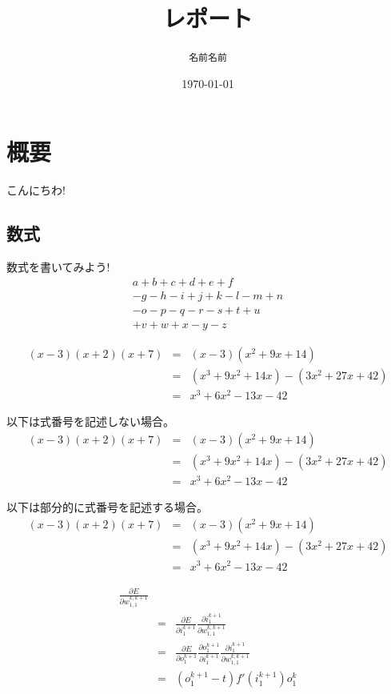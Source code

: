 \documentclass[a4j,uplatex,titlepage]{jsarticle}
\begin{document}
\title{レポート}
\author{\texttt{名前名前}}
\date{\today}
\maketitle
\clearpage

\tableofcontents
\clearpage


\section{概要}
こんにちわ!
\subsection{数式}
数式\cite{eq1}を書いてみよう!
\begin{multline}
    a+b+c+d+e+f \\
    -g-h-i+j+k-l-m+n \\
    -o-p-q-r-s+t+u \\
    +v+w+x-y-z
\end{multline}

\begin{eqnarray}
    (x - 3)(x + 2)(x + 7) &=& (x - 3)(x^2 + 9x + 14) \\
    &=& (x^3 + 9x^2 + 14x) - (3x^2 + 27x + 42) \\
    &=& x^3 + 6x^2 - 13x - 42
\end{eqnarray}

以下は式番号を記述しない場合。
\begin{eqnarray*}
    (x - 3)(x + 2)(x + 7) &=& (x - 3)(x^2 + 9x + 14) \\
    &=& (x^3 + 9x^2 + 14x) - (3x^2 + 27x + 42) \\
    &=& x^3 + 6x^2 - 13x - 42 
\end{eqnarray*}

以下は部分的に式番号を記述する場合。
\begin{eqnarray}
    (x - 3)(x + 2)(x + 7) &=& (x - 3)(x^2 + 9x + 14) \nonumber\\
    &=& (x^3 + 9x^2 + 14x) - (3x^2 + 27x + 42) \nonumber\\
    &=& x^3 + 6x^2 - 13x - 42 
\end{eqnarray}

\begin{eqnarray}
    \frac{\partial E}{\partial w^{k,k+1}_{1,1}}\nonumber\\
    &=& \frac{\partial E}{\partial i^{k+1}_1} \frac{\partial i^{k+1}_1}{\partial w^{k,k+1}_{1,1}}\nonumber\\
    &=& \frac{\partial E}{\partial o^{k+1}_1} \frac{\partial o^{k+1}_1}{\partial i^{k+1}_1} \frac{\partial i^{k+1}_1}{\partial w^{k,k+1}_{1,1}}\nonumber\\
    &=& (o^{k+1}_1 - t)f'(i^{k+1}_1)o^{k}_1
\end{eqnarray}
\end{document}
